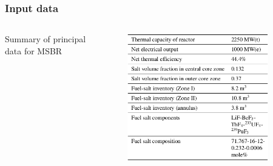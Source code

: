 \begin{frame}
  \frametitle{Input data}
  \begin{columns}
    \column[t]{6cm}
     \begin{table}[h!]
           \vspace*{-0.35in}
    \caption{Summary of principal data for \gls{MSBR} \cite{robertson_conceptual_1971}}
      \end{table}
    \begin{figure}[t]
      \vspace*{-0.45in}
            \includegraphics[height=0.87\textwidth]{./images/table_input.png}
    \end{figure}


\end{columns}
\end{frame}

